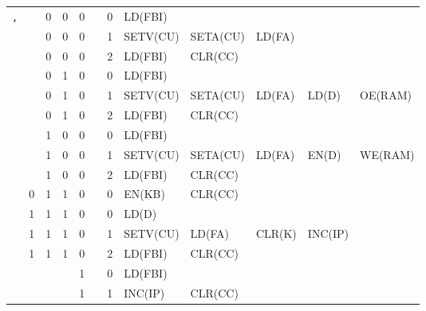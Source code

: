 \begin{footnotesize}
\begin{longtable}[c] {c|ccccc|c|lllll}
    \rowcolor{Gray}\texttt{,}       &   & 0 & 0 & 0 &   & 0  & LD(FBI)     &           &           &         &                \\
    \rowcolor{Gray}                 &   & 0 & 0 & 0 &   & 1  & SETV(CU)    & SETA(CU)  & LD(FA)    &        &                \\ 
    \rowcolor{Gray}                 &   & 0 & 0 & 0 &   & 2  & LD(FBI)     & CLR(CC)          &    &        &                \\
    \rowcolor{White}                &   & 0 & 1 & 0 &   & 0  & LD(FBI)     &           &           &         &               \\
    \rowcolor{White}                &   & 0 & 1 & 0 &   & 1  & SETV(CU)    & SETA(CU)  & LD(FA)    & LD(D)  & OE(RAM)        \\ 
    \rowcolor{White}                &   & 0 & 1 & 0 &   & 2  & LD(FBI)     & CLR(CC)          &   &        &                \\
    \rowcolor{Gray}                 &   & 1 & 0 & 0 &   & 0  & LD(FBI)     &           &           &         &               \\
    \rowcolor{Gray}                 &   & 1 & 0 & 0 &   & 1  & SETV(CU)    & SETA(CU)  & LD(FA)    & EN(D)  & WE(RAM)        \\ 
    \rowcolor{Gray}                 &   & 1 & 0 & 0 &   & 2  & LD(FBI)     & CLR(CC)   &    &        &                \\
    \rowcolor{White}                & 0 & 1 & 1 & 0 &   & 0  & EN(KB)      & CLR(CC)   &           &         &               \\ 
    \rowcolor{Gray}                 & 1 & 1 & 1 & 0 &   & 0  & LD(D)       &           &           &        &                \\ 
    \rowcolor{Gray}                 & 1 & 1 & 1 & 0 &   & 1  & SETV(CU)    & LD(FA)    & CLR(K)    & INC(IP) &               \\ 
    \rowcolor{Gray}                 & 1 & 1 & 1 & 0 &   & 2  & LD(FBI)     & CLR(CC)          &    &        &                \\
    \rowcolor{White}                &   &   &   & 1 &   & 0  & LD(FBI)     &           &           &        &                \\
    \rowcolor{White}                &   &   &   & 1 &   & 1  & INC(IP)     & CLR(CC)   &           &        &                \\ \hline



\end{longtable}
\end{footnotesize}
